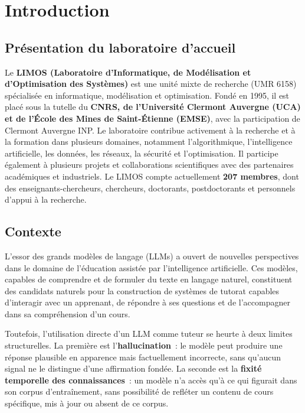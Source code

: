 \documentclass[11pt,a4paper]{article}
\begin{document}
\newpage
\tableofcontents
\newpage
\listoffigures
\listoftables
\newpage

\section{Introduction}
\label{sec:introduction}

\subsection{Présentation du laboratoire d'accueil}
\label{sec:limos}

Le \textbf{LIMOS (Laboratoire d'Informatique, de Modélisation et d'Optimisation des Systèmes)} est une unité mixte de recherche (UMR 6158) spécialisée en informatique, modélisation et optimisation. Fondé en 1995, il est placé sous la tutelle du \textbf{CNRS, de l'Université Clermont Auvergne (UCA) et de l'École des Mines de Saint-Étienne (EMSE)}, avec la participation de Clermont Auvergne INP. Le laboratoire contribue activement à la recherche et à la formation dans plusieurs domaines, notamment l'algorithmique, l'intelligence artificielle, les données, les réseaux, la sécurité et l'optimisation. Il participe également à plusieurs projets et collaborations scientifiques avec des partenaires académiques et industriels. Le LIMOS compte actuellement \textbf{207 membres}, dont des enseignants-chercheurs, chercheurs, doctorants, postdoctorants et personnels d'appui à la recherche.


\subsection{Contexte}

L'essor des grands modèles de langage (LLMs) a ouvert de nouvelles perspectives dans le domaine de l'éducation assistée par l'intelligence artificielle. Ces modèles, capables de comprendre et de formuler du texte en langage naturel, constituent des candidats naturels pour la construction de systèmes de tutorat capables d'interagir avec un apprenant, de répondre à ses questions et de l'accompagner dans sa compréhension d'un cours.

Toutefois, l'utilisation directe d'un LLM comme tuteur se heurte à deux limites structurelles. La première est l'\textbf{hallucination}~: le modèle peut produire une réponse plausible en apparence mais factuellement incorrecte, sans qu'aucun signal ne le distingue d'une affirmation fondée. La seconde est la \textbf{fixité temporelle des connaissances}~: un modèle n'a accès qu'à ce qui figurait dans son corpus d'entraînement, sans possibilité de refléter un contenu de cours spécifique, mis à jour ou absent de ce corpus.
\end{document}
